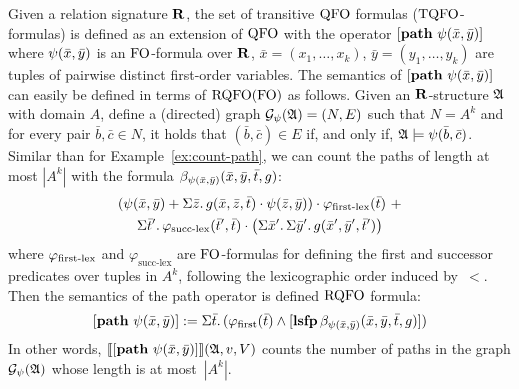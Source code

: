 Given a relation signature $\mathbf{R}$, the set of transitive ${\rm QFO}$ formulas (${\rm TQFO}$-formulas) is defined as an extension of ${\rm QFO}$ with the operator
$
[{\bf path} \,\, \psi(\bar{x},\bar{y})]
$ where $\psi(\bar{x}, \bar{y})$ is an ${\rm FO}$-formula over $\mathbf{R}$, $\bar{x} = (x_1, \ldots, x_k)$, $\bar{y} = (y_1, \ldots, y_k)$ are tuples of pairwise distinct first-order variables. The semantics of $[{\bf path} \,\, \psi(\bar{x},\bar{y})]$ can easily be defined in terms of ${\rm RQFO}({\rm FO})$ as follows. 
Given an $\mathbf{R}$-structure $\mathfrak{A}$ with domain $A$, define a (directed) graph $\cG_{\psi}(\A) = (N,E)$ such that $N = A^k$ and for every pair $\bar b, \bar c \in N$, it holds that $(\bar b, \bar c) \in E$ if, and only if, $\mathfrak{A} \models \psi(\bar b, \bar c)$.
Similar than for Example~\ref{ex:count-path}, we can count the paths of length at most $|A^k|$ with the formula $\beta_{\psi(\bar{x},\bar{y})}(\bar{x}, \bar{y}, \bar{t}, g)$:
\begin{multline*}
(\psi(\bar{x},\bar{y}) + \Sigma{\bar{z}}.\, g(\bar{x},\bar{z},\bar{t})\cdot \psi(\bar{z},\bar{y})) \cdot \varphi_{\text{\rm first-lex}}(\bar{t}) \ +\\
\Sigma{\bar{t}'}.\, \varphi_{\text{succ-lex}}(\bar{t}',\bar{t}) \cdot \left(\Sigma{\bar{x}'}.\, \Sigma{\bar{y}'}.\, g(\bar{x}',\bar{y}',\bar{t}') \right)
\end{multline*}
where $\varphi_{\text{\rm first-lex}}$ and $\varphi_{\text{succ-lex}}$ are ${\rm FO}$-formulas for defining the first and successor predicates over tuples in $A^k$, following the lexicographic order induced by~$<$.
Then the semantics of the path operator is defined ${\rm RQFO}$ formula:
\[
[{\bf path} \,\, \psi(\bar{x}, \bar{y})] := \Sigma{\bar{t}}.\, (\varphi_{\text{\rm first}}(\bar{t}) \wedge [{\bf lsfp} \, \beta_{\psi(\bar{x},\bar{y})}(\bar{x},\bar{y},\bar{t},g)])
\]
In other words, ${\llbracket{}{[{\bf path} \,\, \psi(\bar{x}, \bar{y})]}\rrbracket}(\mathfrak{A},v,V)$ counts the number of paths in the graph $\cG_{\psi}(\A)$ whose length is at most~$|A^k|$.
